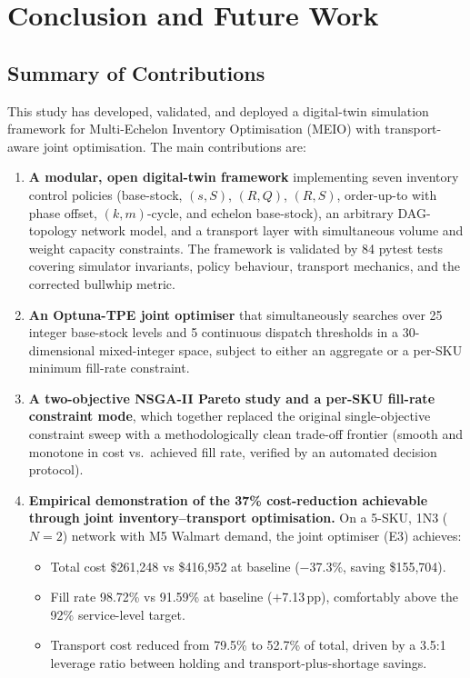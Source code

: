 \chapter{Conclusion and Future Work}
\label{chap:conclusion}

\section{Summary of Contributions}
\label{sec:conc:summary}

This study has developed, validated, and deployed a digital-twin simulation
framework for Multi-Echelon Inventory Optimisation (MEIO) with
transport-aware joint optimisation.  The main contributions are:

\begin{enumerate}
  \item \textbf{A modular, open digital-twin framework} implementing
        seven inventory control policies (base-stock, $(s,S)$, $(R,Q)$,
        $(R,S)$, order-up-to with phase offset, $(k,m)$-cycle, and
        echelon base-stock), an arbitrary DAG-topology network model,
        and a transport layer with simultaneous volume and weight
        capacity constraints.  The framework is validated by
        84 pytest tests covering simulator invariants,
        policy behaviour, transport mechanics, and the corrected
        bullwhip metric.

  \item \textbf{An Optuna-TPE joint optimiser} that simultaneously
        searches over 25 integer base-stock levels and 5 continuous
        dispatch thresholds in a 30-dimensional mixed-integer space,
        subject to either an aggregate or a per-SKU minimum fill-rate
        constraint.

  \item \textbf{A two-objective NSGA-II Pareto study and a per-SKU
        fill-rate constraint mode}, which together replaced the
        original single-objective constraint sweep with a
        methodologically clean trade-off frontier (smooth and monotone
        in cost vs.\ achieved fill rate, verified by an automated
        decision protocol).

  \item \textbf{Empirical demonstration of the 37\% cost-reduction
        achievable through joint inventory--transport optimisation.}
        On a 5-SKU, 1N3 ($N=2$) network with M5 Walmart demand, the
        joint optimiser (E3) achieves:
        \begin{itemize}
          \item Total cost \$261,248 vs \$416,952 at baseline
                ($-$37.3\%, saving \$155,704).
          \item Fill rate 98.72\% vs 91.59\% at baseline ($+$7.13\,pp),
                comfortably above the 92\% service-level target.
          \item Transport cost reduced from 79.5\% to 52.7\% of total,
                driven by a 3.5:1 leverage ratio between holding and
                transport-plus-shortage savings.
        \end{itemize}


\end{enumerate}

